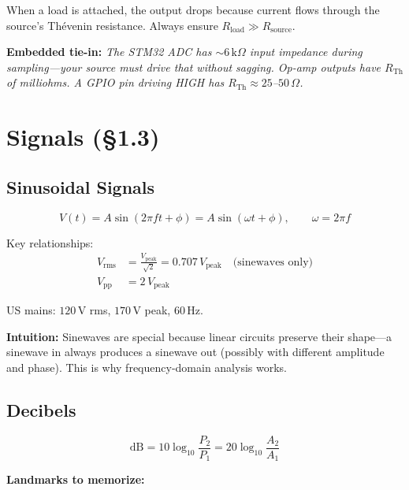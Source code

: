 \documentclass[11pt,a4paper]{article}
\newcommand{\intuition}[1]{\par\textcolor{intuition}{\textbf{Intuition:}} #1}
\newcommand{\embedded}[1]{\par\textcolor{embed}{\textbf{Embedded tie-in:}} \textit{#1}}
\begin{document}
When a load is attached, the output drops because current flows through the source's Th\'{e}venin resistance. Always ensure $R_{\text{load}} \gg R_{\text{source}}$.

\embedded{The STM32 ADC has $\sim 6\,\text{k}\Omega$ input impedance during sampling---your source must drive that without sagging. Op-amp outputs have $R_{\text{Th}}$ of milliohms. A GPIO pin driving HIGH has $R_{\text{Th}} \approx 25$--$50\,\Omega$.}

\section{Signals (\S1.3)}

\subsection{Sinusoidal Signals}

\begin{equation}
V(t) = A \sin(2\pi f t + \phi) = A \sin(\omega t + \phi), \qquad \omega = 2\pi f
\end{equation}

Key relationships:
\begin{align}
V_{\text{rms}} &= \frac{V_{\text{peak}}}{\sqrt{2}} = 0.707 \, V_{\text{peak}} \quad \text{(sinewaves only)} \\
V_{\text{pp}} &= 2 \, V_{\text{peak}}
\end{align}

US mains: $120\,$V rms, $170\,$V peak, $60\,$Hz.

\intuition{Sinewaves are special because linear circuits preserve their shape---a sinewave in always produces a sinewave out (possibly with different amplitude and phase). This is why frequency-domain analysis works.}

\subsection{Decibels}

\begin{equation}
\text{dB} = 10 \log_{10}\!\frac{P_2}{P_1} = 20 \log_{10}\!\frac{A_2}{A_1}
\end{equation}

\textbf{Landmarks to memorize:}
\end{document}

